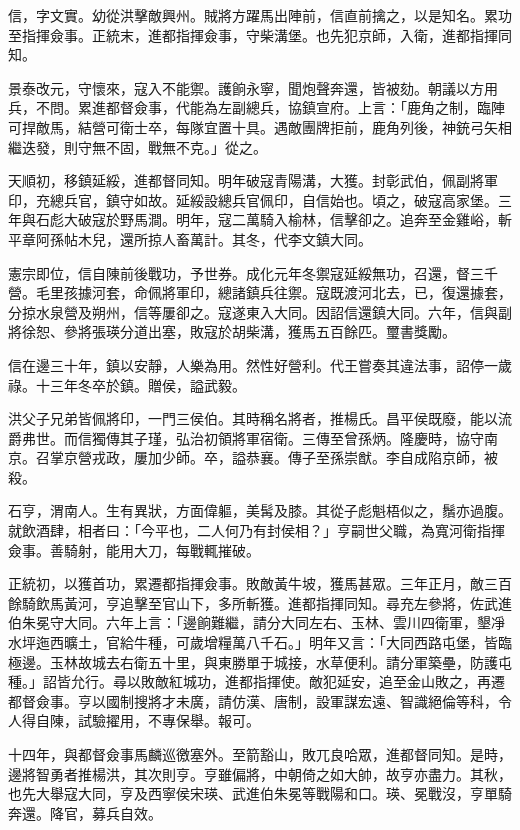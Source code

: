 \begin{pinyinscope}
信，字文實。幼從洪擊敵興州。賊將方躍馬出陣前，信直前擒之，以是知名。累功至指揮僉事。正統末，進都指揮僉事，守柴溝堡。也先犯京師，入衛，進都指揮同知。

景泰改元，守懷來，寇入不能禦。護餉永寧，聞炮聲奔還，皆被劾。朝議以方用兵，不問。累進都督僉事，代能為左副總兵，協鎮宣府。上言：「鹿角之制，臨陣可捍敵馬，結營可衛士卒，每隊宜置十具。遇敵團牌拒前，鹿角列後，神銃弓矢相繼迭發，則守無不固，戰無不克。」從之。

天順初，移鎮延綏，進都督同知。明年破寇青陽溝，大獲。封彰武伯，佩副將軍印，充總兵官，鎮守如故。延綏設總兵官佩印，自信始也。頃之，破寇高家堡。三年與石彪大破寇於野馬澗。明年，寇二萬騎入榆林，信擊卻之。追奔至金雞峪，斬平章阿孫帖木兒，還所掠人畜萬計。其冬，代李文鎮大同。

憲宗即位，信自陳前後戰功，予世券。成化元年冬禦寇延綏無功，召還，督三千營。毛里孩據河套，命佩將軍印，總諸鎮兵往禦。寇既渡河北去，已，復還據套，分掠水泉營及朔州，信等屢卻之。寇遂東入大同。因詔信還鎮大同。六年，信與副將徐恕、參將張瑛分道出塞，敗寇於胡柴溝，獲馬五百餘匹。璽書獎勵。

信在邊三十年，鎮以安靜，人樂為用。然性好營利。代王嘗奏其違法事，詔停一歲祿。十三年冬卒於鎮。贈侯，謚武毅。

洪父子兄弟皆佩將印，一門三侯伯。其時稱名將者，推楊氏。昌平侯既廢，能以流爵弗世。而信獨傳其子瑾，弘治初領將軍宿衛。三傳至曾孫炳。隆慶時，協守南京。召掌京營戎政，屢加少師。卒，謚恭襄。傳子至孫崇猷。李自成陷京師，被殺。

石亨，渭南人。生有異狀，方面偉軀，美髯及膝。其從子彪魁梧似之，鬚亦過腹。就飲酒肆，相者曰：「今平也，二人何乃有封侯相？」亨嗣世父職，為寬河衛指揮僉事。善騎射，能用大刀，每戰輒摧破。

正統初，以獲首功，累遷都指揮僉事。敗敵黃牛坡，獲馬甚眾。三年正月，敵三百餘騎飲馬黃河，亨追擊至官山下，多所斬獲。進都指揮同知。尋充左參將，佐武進伯朱冕守大同。六年上言：「邊餉難繼，請分大同左右、玉林、雲川四衛軍，墾凈水坪迤西曠土，官給牛種，可歲增糧萬八千石。」明年又言：「大同西路屯堡，皆臨極邊。玉林故城去右衛五十里，與東勝單于城接，水草便利。請分軍築壘，防護屯種。」詔皆允行。尋以敗敵紅城功，進都指揮使。敵犯延安，追至金山敗之，再遷都督僉事。亨以國制搜將才未廣，請仿漢、唐制，設軍謀宏遠、智識絕倫等科，令人得自陳，試驗擢用，不專保舉。報可。

十四年，與都督僉事馬麟巡徼塞外。至箭豁山，敗兀良哈眾，進都督同知。是時，邊將智勇者推楊洪，其次則亨。亨雖偏將，中朝倚之如大帥，故亨亦盡力。其秋，也先大舉寇大同，亨及西寧侯宋瑛、武進伯朱冕等戰陽和口。瑛、冕戰沒，亨單騎奔還。降官，募兵自效。


\end{pinyinscope}
